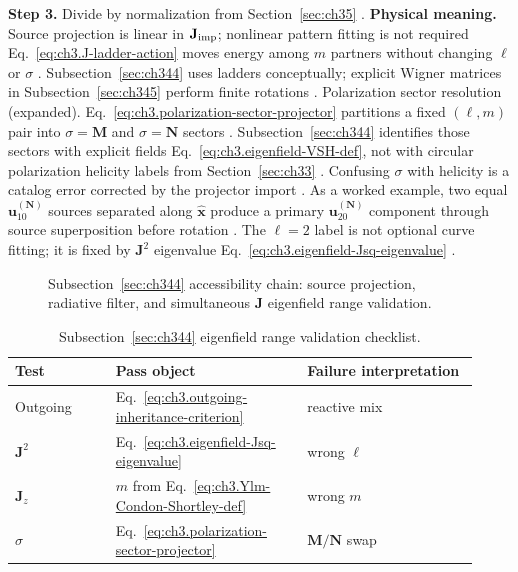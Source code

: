 \textbf{Step 3.} Divide by normalization from Section~\ref{sec:ch35} .
\textbf{Physical meaning.} Source projection is linear in \(\mathbf{J}_{\mathrm{imp}}\); nonlinear pattern fitting is not required
Eq.~\eqref{eq:ch3.J-ladder-action} moves energy among \(m\) partners without changing \(\ell\) or \(\sigma\)
. Subsection~\ref{sec:ch344} uses ladders conceptually; explicit Wigner matrices in
Subsection~\ref{sec:ch345} perform finite rotations .
Polarization sector resolution (expanded). Eq.~\eqref{eq:ch3.polarization-sector-projector} partitions a fixed \((\ell,m)\) pair into \(\sigma=\mathbf{M}\) and
\(\sigma=\mathbf{N}\) sectors . Subsection~\ref{sec:ch344} identifies those sectors with
explicit fields Eq.~\eqref{eq:ch3.eigenfield-VSH-def}, not with circular polarization helicity labels from
Section~\ref{sec:ch33} . Confusing \(\sigma\) with helicity is a catalog error
corrected by the projector import .
As a worked example, two equal \(\mathbf{u}_{10}^{(\mathbf{N})}\) sources separated along \(\hat{\mathbf{x}}\) produce a primary
\(\mathbf{u}_{20}^{(\mathbf{N})}\) component through source superposition before rotation .
The \(\ell=2\) label is not optional curve fitting; it is fixed by \(\mathbf{J}^{2}\) eigenvalue
Eq.~\eqref{eq:ch3.eigenfield-Jsq-eigenvalue} .
\begin{figure}[t]
\centering
{}
\caption{Subsection~\ref{sec:ch344} accessibility chain: source projection, radiative filter, and simultaneous
\(\mathbf{J}\) eigenfield range validation.}
\label{fig:ch3.344-accessibility-chain}
\end{figure}
\begin{table}[t]
\centering
\caption{Subsection~\ref{sec:ch344} eigenfield range validation checklist.}
\label{tab:ch3.344-certification-checklist}
\small
\begin{tabular}{@{}p{0.20\linewidth}p{0.38\linewidth}p{0.34\linewidth}@{}}
\toprule
Test & Pass object & Failure interpretation \\
\midrule
Outgoing & Eq.~\eqref{eq:ch3.outgoing-inheritance-criterion} & reactive mix \\
\(\mathbf{J}^{2}\) & Eq.~\eqref{eq:ch3.eigenfield-Jsq-eigenvalue} & wrong \(\ell\) \\
\(\mathbf{J}_{z}\) & \(m\) from Eq.~\eqref{eq:ch3.Ylm-Condon-Shortley-def} & wrong \(m\) \\
\(\sigma\) & Eq.~\eqref{eq:ch3.polarization-sector-projector} & \(\mathbf{M}/\mathbf{N}\) swap \\
\bottomrule
\end{tabular}
\end{table}
